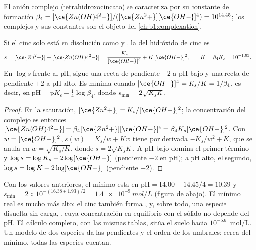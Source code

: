 El anión complejo  (tetrahidroxocincato) se caracteriza
por su constante de formación $\beta_4 = [\ce{Zn(OH)4^2-}]/([\ce{Zn^2+}][\ce{OH-}]^4)
= 10^{14.45}$; los complejos y sus constantes son el objeto del
\cref{ch:b1:complexation}.

\begin{proposition}\label{prop:b1:precipitation:amphoteric}
Si el cinc solo está en disolución como  y , la
 del hidróxido de cinc es
\[
  s = [\ce{Zn^2+}] + [\ce{Zn(OH)4^2-}] = \frac{K_s}{[\ce{OH-}]^2} + K\,[\ce{OH-}]^2,
  \qquad K = \beta_4 K_s = 10^{-1.93} .
\]
En $\log s$ frente al pH, sigue una recta de pendiente $-2$ a pH bajo y una
recta de pendiente $+2$ a pH alto. Es mínima cuando
$[\ce{OH-}]^4 = K_s/K = 1/\beta_4$, es decir, en $\mathrm{pH} =
\mathrm{p}K_e - \frac14\log\beta_4$, donde $s_{\min} = 2\sqrt{K_s K}$.
\end{proposition}

\begin{proof}
En la saturación, $[\ce{Zn^2+}] = K_s/[\ce{OH-}]^2$; la concentración del
complejo es entonces
$[\ce{Zn(OH)4^2-}] = \beta_4[\ce{Zn^2+}][\ce{OH-}]^4 = \beta_4 K_s
[\ce{OH-}]^2$. Con $w = [\ce{OH-}]^2$, $s(w) = K_s/w + Kw$ tiene por
derivada $-K_s/w^2 + K$, que se anula en $w = \sqrt{K_s/K}$, donde
$s = 2\sqrt{K_s K}$. A
pH bajo domina el primer término y $\log s = \log K_s - 2\log[\ce{OH-}]$
(pendiente $-2$ en pH); a pH alto, el segundo, $\log s = \log K + 2\log[\ce{OH-}]$
(pendiente $+2$).
\end{proof}

Con los valores anteriores, el mínimo está en
$\mathrm{pH} = 14.00 - 14.45/4
= 10.39$ y $s_{\min} = 2 \times 10^{-(16.38 + 1.93)/2} =
\qty{1.4e-9}{mol/L}$
(figura de abajo). El mínimo real es mucho más alto: el cinc también forma
,  y, sobre todo, una especie disuelta sin carga,
, cuya concentración en equilibrio con el sólido no
depende del pH. El cálculo completo, con las mismas tablas, sitúa el suelo
hacia $10^{-5.6}$~mol/L. Un modelo de dos especies da las pendientes y el
orden de los umbrales; cerca del mínimo, todas las especies cuentan.

